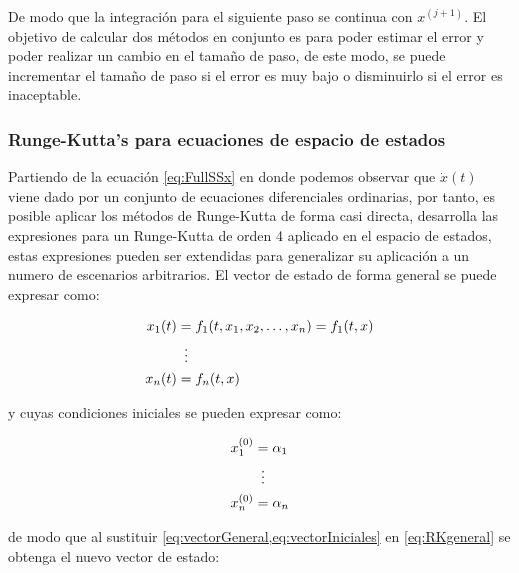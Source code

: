         De modo que la integración para el siguiente paso se continua con $x^{(j+1)}$. El objetivo de calcular dos métodos en conjunto es para poder estimar el error y poder realizar un cambio en el tamaño de paso, de este modo, se puede incrementar el tamaño de paso si el error es muy bajo o disminuirlo si el error es inaceptable.
        
        \subsubsection{Runge-Kutta's para ecuaciones de espacio de estados}

            Partiendo de la ecuación \cref{eq:FullSSx} en donde podemos observar que $\dot{x}(t)$ viene dado por un conjunto de ecuaciones diferenciales ordinarias, por tanto, es posible aplicar los métodos de Runge-Kutta de forma casi directa, \textcite{horacio1997metodos} desarrolla las expresiones para un Runge-Kutta de orden 4 aplicado en el espacio de estados, estas expresiones pueden ser extendidas para generalizar su aplicación a un numero de escenarios arbitrarios. El vector de estado de forma general se puede expresar como:
            
            \begin{equation}\label{eq:vectorGeneral}
                \begin{aligned}
                    x_1(t) &= f_1(t, x_1, x_2, \dots, x_n) = f_1(t,x)\\
                    &\mathrel{\makebox[\widthof{=}]{\vdots}}\\
                    x_n(t) &=  f_n(t,x)
                \end{aligned}
            \end{equation}

            \noindent y cuyas condiciones iniciales se pueden expresar como:

            \begin{equation}\label{eq:vectorIniciales}
                \begin{aligned}
                    x_1^{(0)} &= \alpha_1\\
                    &\mathrel{\makebox[\widthof{=}]{\vdots}}\\
                    x_n^{(0)} &=  \alpha_n
                \end{aligned}
            \end{equation}
            
            \noindent de modo que al sustituir \cref{eq:vectorGeneral,eq:vectorIniciales} en \cref{eq:RKgeneral} se obtenga el nuevo vector de estado:


